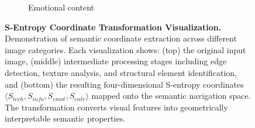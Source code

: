 \begin{figure}[htbp]
\begin{subfigure}{0.32\textwidth}
\caption{Emotional content}
\end{subfigure}
\caption{\textbf{S-Entropy Coordinate Transformation Visualization.} Demonstration of semantic coordinate extraction across different image categories. Each visualization shows: (top) the original input image, (middle) intermediate processing stages including edge detection, texture analysis, and structural element identification, and (bottom) the resulting four-dimensional S-entropy coordinates $\langle S_{tech}, S_{info}, S_{emot}, S_{entr} \rangle$ mapped onto the semantic navigation space. The transformation converts visual features into geometrically interpretable semantic properties.}
\label{fig:s-entropy-transformation}
\end{figure}
